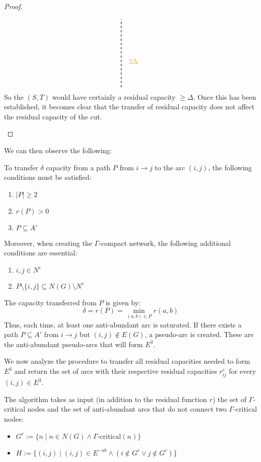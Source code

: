 \begin{proof}
\begin{enumerate}
\[\begin{tikzpicture}[node distance={15mm}, thick , main/.style = {draw, circle}]
                    \draw[dashed] (1.8,-1.7) -- (1.8,1.7);
                    \node at (2.4, -.4) {\text{\color{darktangerine}{$2\Delta$}}};
                \end{tikzpicture}\]
                So the $(S,T)$ would have certainly a residual capacity $\ge \Delta$.
                Once this has been established, it becomes clear that the transfer of residual capacity does not affect the residual capacity of the cut.
        \end{enumerate}
    \end{proof}
    We can then observe the following:

    \begin{definition}
    
    To transfer $\delta$ capacity from a path \( P \) from \( i \rightarrow j \) to the arc \( (i,j) \), the following conditions must be satisfied:
    \begin{enumerate}
        \item \( |P| \ge 2 \)
        \item \( r(P) > 0 \)
        \item \( P \subseteq A' \)
    \end{enumerate}
    
    Moreover, when creating the \(\Gamma\)-compact network, the following additional conditions are essential:
    \begin{enumerate}
        \item \( i,j \in N^c \)
        \item \( P \setminus \{i,j\} \subseteq N(G) \setminus N^c \)
    \end{enumerate}
    
    \end{definition}
    
    The capacity transferred from \( P \) is given by:
    \[
    \delta = r(P) = \min_{(a,b) \in P} r(a,b)
    \]
    Thus, each time, at least one anti-abundant arc is saturated. If there exists a path \( P \subseteq A' \) from \( i \rightarrow j \) but \( (i,j) \notin E(G) \), a pseudo-arc is created. These are the anti-abundant pseudo-arcs that will form \( E^3 \).
    
    We now analyze the procedure to transfer all residual capacities needed to form \( E^3 \) and return the set of arcs with their respective residual capacities \( r^c_{ij} \) for every \( (i,j) \in E^3 \).
    
    The algorithm takes as input (in addition to the residual function \( r \)) the set of \(\Gamma\)-critical nodes and the set of anti-abundant arcs that do not connect two \(\Gamma\)-critical nodes:
    \begin{itemize}
        \item \( G^c := \{n \mid n \in N(G) \land \Gamma\text{-critical}(n)\} \)
        \item \( H := \{(i,j) \mid (i,j) \in E^{-ab} \land (i \notin G^c \lor j \notin G^c)\} \)
    \end{itemize}
    
